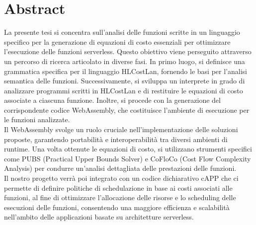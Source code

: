 \documentclass[12pt,a4paper]{report}
\begin{document}


\pagestyle{headings} 

\clearpage

\chapter*{Abstract}
La presente tesi si concentra sull'analisi delle funzioni scritte in un linguaggio specifico per la generazione di equazioni di costo essenziali per ottimizzare l'esecuzione delle funzioni serverless. Questo obiettivo viene perseguito attraverso un percorso di ricerca articolato in diverse fasi. In primo luogo, si definisce una grammatica specifica per il linguaggio HLCostLan, fornendo le basi per l'analisi semantica delle funzioni. Successivamente, si sviluppa un interprete in grado di analizzare programmi scritti in HLCostLan e di restituire le equazioni di costo associate a ciascuna funzione. Inoltre, si procede con la generazione del corrispondente codice WebAssembly, che costituisce l'ambiente di esecuzione per le funzioni analizzate.\\
Il WebAssembly svolge un ruolo cruciale nell'implementazione delle soluzioni proposte, garantendo portabilità e interoperabilità tra diversi ambienti di runtime. Una volta ottenute le equazioni di costo, si utilizzano strumenti specifici come PUBS (Practical Upper Bounds Solver) e CoFloCo (Cost Flow Complexity Analysis) per condurre un'analisi dettagliata delle prestazioni delle funzioni.\\
Il nostro progetto verrà poi integrato con un codice dichiarativo cAPP che ci permette di definire politiche di schedulazione in base ai costi associati alle funzioni, al fine di ottimizzare l'allocazione delle risorse e lo scheduling delle esecuzioni delle funzioni, consentendo una maggiore efficienza e scalabilità nell'ambito delle applicazioni basate su architetture serverless.\\
\tableofcontents

\listoffigures

\renewcommand\lstlistlistingname{Indice di Codice}

\lstlistoflistings





 








\printbibliography[title={Bibliografia}, sorting=none]
\end{document}
